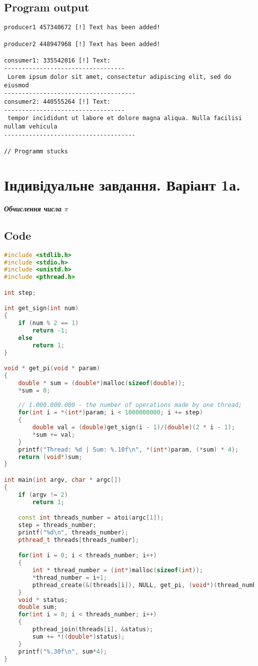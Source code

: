 \documentclass{article}
\begin{document}
\subsection{Program output}
\begin{verbatim}
producer1 457340672 [!] Text has been added! 

producer2 448947968 [!] Text has been added! 

consumer1: 335542016 [!] Text: 
----------------------------------
 Lorem ipsum dolor sit amet, consectetur adipiscing elit, sed do eiusmod 
-------------------------------------
consumer2: 440555264 [!] Text: 
----------------------------------
 tempor incididunt ut labore et dolore magna aliqua. Nulla facilisi nullam vehicula 
-------------------------------------

// Programm stucks

\end{verbatim}

\newpage

\section{Індивідуальне завдання. Варіант 1а.}
\textbf{\textit{ Обчислення числа $\pi$}}

\subsection{Code}

\begin{lstlisting}[language=C++]
#include <stdlib.h>
#include <stdio.h>
#include <unistd.h>
#include <pthread.h>

int step;

int get_sign(int num)
{
    if (num % 2 == 1)
        return -1;
    else
        return 1;
}

void * get_pi(void * param)
{
    double * sum = (double*)malloc(sizeof(double));
    *sum = 0;
    
    // 1.000.000.000 - the number of operations made by one thread; 
    for(int i = *(int*)param; i < 1000000000; i += step)
    {
        double val = (double)get_sign(i - 1)/(double)(2 * i - 1);
        *sum += val;
    }
    printf("Thread: %d | Sum: %.10f\n", *(int*)param, (*sum) * 4);
    return (void*)sum;
}

int main(int argv, char * argc[])
{
    if (argv != 2)
        return 1;

    const int threads_number = atoi(argc[1]);
    step = threads_number;
    printf("%d\n", threads_number);
    pthread_t threads[threads_number];

    for(int i = 0; i < threads_number; i++)
    {
        int * thread_number = (int*)malloc(sizeof(int));
        *thread_number = i+1;
        pthread_create(&(threads[i]), NULL, get_pi, (void*)(thread_number));
    }
    void * status;
    double sum;
    for(int i = 0; i < threads_number; i++)
    {
        pthread_join(threads[i], &status);
        sum += *((double*)status);
    }
    printf("%.30f\n", sum*4);
}
\end{lstlisting}
\newpage
\end{document}
